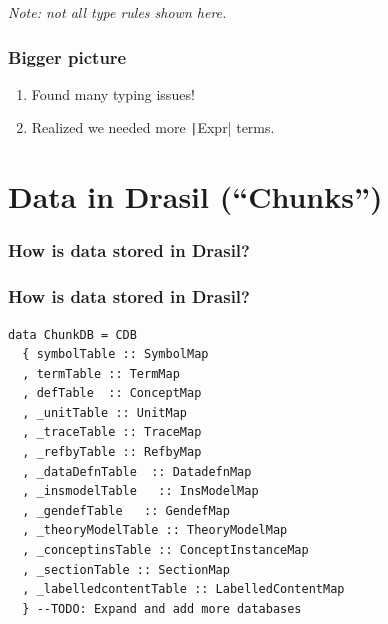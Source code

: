 \documentclass[xcolor={dvipsnames}]{beamer}
\newcommand{\inlineHs}[1]{\texttt|#1|}
\begin{document}
\begin{frame}
  \vfill
  {\tiny \hfill \emph{Note: not all type rules shown here.}}
\end{frame}

\begin{frame}
  \frametitle{Bigger picture}

  \begin{enumerate}
    \item Found many typing issues!
    \item Realized we needed more \inlineHs{Expr} terms.
  \end{enumerate}

\end{frame}

\section{Data in Drasil (\textquotedblleft{}Chunks\textquotedblright{})}

\begin{frame}
  \frametitle{How is data stored in Drasil?}

  \centering
  

\end{frame}

\begin{frame}[fragile]
  \frametitle{How is data stored in Drasil?}

\begin{verbatim}
data ChunkDB = CDB 
  { symbolTable :: SymbolMap
  , termTable :: TermMap 
  , defTable  :: ConceptMap
  , _unitTable :: UnitMap
  , _traceTable :: TraceMap
  , _refbyTable :: RefbyMap
  , _dataDefnTable  :: DatadefnMap
  , _insmodelTable   :: InsModelMap
  , _gendefTable   :: GendefMap
  , _theoryModelTable :: TheoryModelMap
  , _conceptinsTable :: ConceptInstanceMap
  , _sectionTable :: SectionMap
  , _labelledcontentTable :: LabelledContentMap
  } --TODO: Expand and add more databases
\end{verbatim}

\end{frame}
\end{document}
